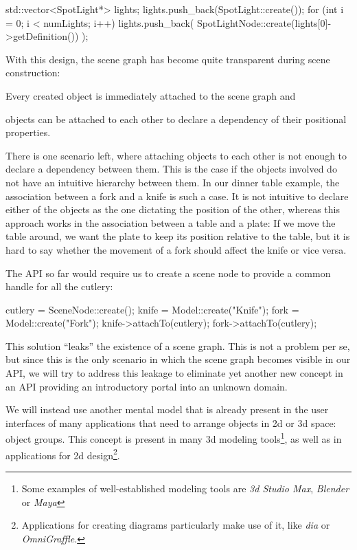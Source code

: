 	\begin{code}[2]
		std::vector<SpotLight*> lights;
		lights.push_back(SpotLight::create());
		for (int i = 0; i < numLights; i++)
		{
		    lights.push_back(
		        SpotLightNode::create(lights[0]->getDefinition())
		    );
		}
	\end{code}

	With this design, the scene graph has become quite transparent during scene construction:

	\begin{smalllist}
		\item Every created object is immediately attached to the scene graph and
		\item objects can be attached to each other to declare a dependency of their positional properties.
	\end{smalllist}

	There is one scenario left, where attaching objects to each other is not enough to declare a dependency between them. This is the case if the objects involved do not have an intuitive hierarchy between them. In our dinner table example, the association between a fork and a knife is such a case. It is not intuitive to declare either of the objects as the one dictating the position of the other, whereas this approach works in the association between a table and a plate: If we move the table around, we want the plate to keep its position relative to the table, but it is hard to say whether the movement of a fork should affect the knife or vice versa.

	The API so far would require us to create a scene node to provide a common handle for all the cutlery:
	
	\begin{code}[2]
		cutlery = SceneNode::create();
		knife = Model::create("Knife");
		fork = Model::create("Fork");
		knife->attachTo(cutlery);
		fork->attachTo(cutlery);
	\end{code}

	This solution ``leaks'' the existence of a scene graph. This is not a problem per se, but since this is the only scenario in which the scene graph becomes visible in our API, we will try to address this leakage to eliminate yet another new concept in an API providing an introductory portal into an unknown domain.
	
	We will instead use another mental model that is already present in the user interfaces of many applications that need to arrange objects in 2d or 3d space: object groups. This concept is present in many 3d modeling tools\footnote{Some examples of well-established modeling tools are \emph{3d Studio Max}, \emph{Blender} or \emph{Maya}}, as well as in applications for 2d design\footnote{Applications for creating diagrams particularly make use of it, like \emph{dia} or \emph{OmniGraffle}.}.

